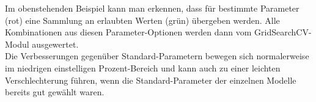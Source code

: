 Im obenstehenden Beispiel kann man erkennen, dass für bestimmte Parameter (rot) eine Sammlung an erlaubten 
Werten (grün) übergeben werden. Alle Kombinationen aus diesen Parameter-Optionen werden dann vom 
GridSearchCV-Modul ausgewertet.\\
Die Verbesserungen gegenüber Standard-Parametern bewegen sich normalerweise im niedrigen einstelligen 
Prozent-Bereich und kann auch zu einer leichten Verschlechterung führen, wenn die Standard-Parameter
der einzelnen Modelle bereits gut gewählt waren.

